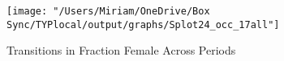 \documentclass[12pt]{article}
\begin{document}



\begin{figure}[H]
\centering
\caption{Transitions in Fraction Female Across Periods}
\label{transitions17}
\texttt{[image: "/Users/Miriam/OneDrive/Box Sync/TYPlocal/output/graphs/Splot24\_occ\_17all"]}
\end{figure}


\end{document}
